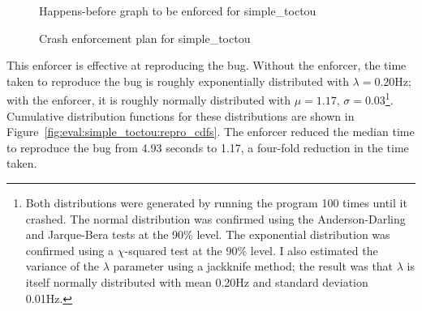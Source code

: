 \begin{figure}
  \caption{Happens-before graph to be enforced for simple\_toctou}
  \label{fig:eval:simple_toctou:hb_graph}
\end{figure}

\begin{figure}
  \caption{Crash enforcement plan for simple\_toctou}
  \label{fig:eval:simple_toctou:enforce_plan}
\end{figure}

This enforcer is effective at reproducing the bug.  Without the
enforcer, the time taken to reproduce the bug is roughly exponentially
distributed with $\lambda = 0.20$Hz; with the enforcer, it is roughly
normally distributed with $\mu = 1.17$, $\sigma = 0.03$\footnote{Both
  distributions were generated by running the program 100 times until
  it crashed.  The normal distribution was confirmed using the
  Anderson-Darling and Jarque-Bera tests at the 90\% level.  The
  exponential distribution was confirmed using a $\chi$-squared test
  at the 90\% level.  I also estimated the variance of the $\lambda$
  parameter using a jackknife method; the result was that $\lambda$ is
  itself normally distributed with mean 0.20Hz and standard deviation
  0.01Hz.}.  Cumulative distribution functions for these distributions
are shown in Figure~\ref{fig:eval:simple_toctou:repro_cdfs}.  The
enforcer reduced the median time to reproduce the bug from 4.93
seconds to 1.17, a four-fold reduction in the time taken.

